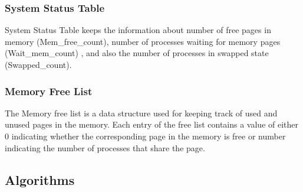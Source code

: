 \documentclass[10pt]{article}
\begin{document}
\subsubsection{System Status Table}
System Status Table keeps the information about number of free pages in memory (Mem\_free\_count), number of processes waiting for memory pages (Wait\_mem\_count) , and also the number of processes in swapped state (Swapped\_count).
\subsubsection{Memory Free List}
The Memory free list is a data structure used for keeping track of used and unused pages in the memory. Each entry of the free list contains a value of either 0 indicating whether the corresponding page in the memory is free or number indicating the number of processes that share the page.
\subsection{Algorithms}
\end{document}
